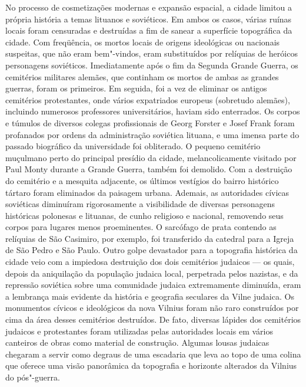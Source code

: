 No processo de cosmetizações modernas e expansão espacial, a cidade
limitou a própria história a temas lituanos e soviéticos. Em ambos os
casos, várias ruínas locais foram censuradas e destruídas a fim de
sanear a superfície topográfica da cidade. Com freqüência, os mortos
locais de origens ideológicas ou nacionais suspeitas, que não eram
bem"-vindos, eram substituídos por relíquias de heróicos personagens
soviéticos. Imediatamente após o fim da Segunda Grande Guerra, os
cemitérios militares alemães, que continham os mortos de ambas as
grandes guerras, foram os primeiros. Em seguida, foi a vez de eliminar
os antigos cemitérios protestantes, onde vários expatriados europeus
(sobretudo alemães), incluindo numerosos professores universitários,
haviam sido enterrados. Os corpos e túmulos de diversos colegas
profissionais de Georg Forster e Josef Frank foram profanados por ordens
da administração soviética lituana, e uma imensa parte do passado
biográfico da universidade foi obliterado. O pequeno cemitério muçulmano
perto do principal presídio da cidade, melancolicamente visitado por
Paul Monty durante a Grande Guerra, também foi demolido. Com a
destruição do cemitério e a mesquita adjacente, os últimos vestígios do
bairro histórico tártaro foram eliminados da paisagem urbana. Ademais,
as autoridades cívicas soviéticas diminuíram rigorosamente a
visibilidade de diversas personagens históricas polonesas e lituanas, de
cunho religioso e nacional, removendo seus corpos para lugares menos
proeminentes. O sarcófago de prata contendo as relíquias de São
Casimiro, por exemplo, foi transferido da catedral para a Igreja de São
Pedro e São Paulo. Outro golpe devastador para a topografia histórica da
cidade veio com a impiedosa destruição dos dois cemitérios judaicos --- os
quais, depois da aniquilação da população judaica local, perpetrada
pelos nazistas, e da repressão soviética sobre uma comunidade judaica
extremamente diminuída, eram a lembrança mais evidente da história e
geografia seculares da Vilne judaica. Os monumentos cívicos e
ideológicos da nova Vilnius foram não raro construídos por cima da área
desses cemitérios destruídos. De fato, diversas lápides dos cemitérios
judaicos e protestantes foram utilizadas pelas autoridades locais em
vários canteiros de obras como material de construção. Algumas lousas
judaicas chegaram a servir como degraus de uma escadaria que leva ao
topo de uma colina que oferece uma visão panorâmica da topografia e
horizonte alterados da Vilnius do pós"-guerra.

%

